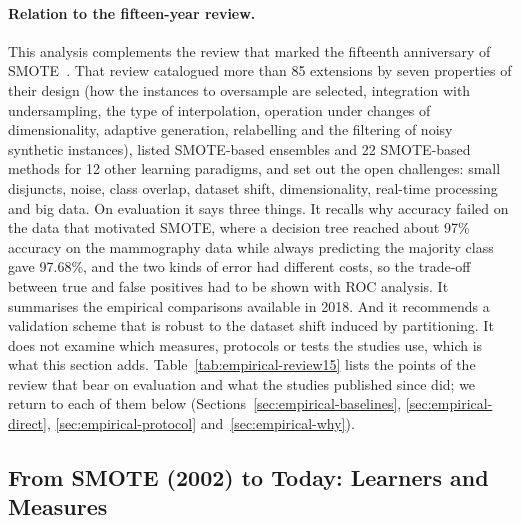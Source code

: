 \paragraph{Relation to the fifteen-year review.} This analysis complements the review that marked the fifteenth anniversary of SMOTE~\parencite{fernandez2018smote}. That review catalogued more than 85 extensions by seven properties of their design (how the instances to oversample are selected, integration with undersampling, the type of interpolation, operation under changes of dimensionality, adaptive generation, relabelling and the filtering of noisy synthetic instances), listed SMOTE-based ensembles and 22 SMOTE-based methods for 12 other learning paradigms, and set out the open challenges: small disjuncts, noise, class overlap, dataset shift, dimensionality, real-time processing and big data. On evaluation it says three things. It recalls why accuracy failed on the data that motivated SMOTE, where a decision tree reached about 97\% accuracy on the mammography data while always predicting the majority class gave 97.68\%, and the two kinds of error had different costs, so the trade-off between true and false positives had to be shown with ROC analysis. It summarises the empirical comparisons available in 2018. And it recommends a validation scheme that is robust to the dataset shift induced by partitioning. It does not examine which measures, protocols or tests the studies use, which is what this section adds. Table~\ref{tab:empirical-review15} lists the points of the review that bear on evaluation and what the studies published since did; we return to each of them below (Sections~\ref{sec:empirical-baselines}, \ref{sec:empirical-direct}, \ref{sec:empirical-protocol} and~\ref{sec:empirical-why}).



\subsection{From SMOTE (2002) to Today: Learners and Measures}
\label{sec:empirical-thennow}


